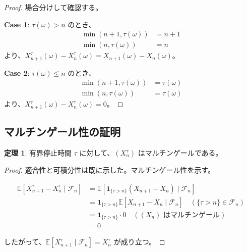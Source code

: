 \documentclass[12pt,a4paper]{article}
\theoremstyle{definition}
\newtheorem{theorem}[definition]{定理}
\newcommand{\E}{\mathbb{E}}
\newcommand{\cF}{\mathcal{F}}
\begin{document}
\begin{proof}
場合分けして確認する。

\textbf{Case 1}: $\tau(\omega) > n$ のとき、
\begin{align*}
\min(n+1, \tau(\omega)) &= n+1 \\
\min(n, \tau(\omega)) &= n
\end{align*}
より、$X^\tau_{n+1}(\omega) - X^\tau_n(\omega) = X_{n+1}(\omega) - X_n(\omega)$。

\textbf{Case 2}: $\tau(\omega) \leq n$ のとき、
\begin{align*}
\min(n+1, \tau(\omega)) &= \tau(\omega) \\
\min(n, \tau(\omega)) &= \tau(\omega)
\end{align*}
より、$X^\tau_{n+1}(\omega) - X^\tau_n(\omega) = 0$。
\end{proof}

\subsection{マルチンゲール性の証明}

\begin{theorem}
有界停止時間 $\tau$ に対して、$(X^\tau_n)$ はマルチンゲールである。
\end{theorem}

\begin{proof}
適合性と可積分性は既に示した。マルチンゲール性を示す。

\begin{align*}
\E[X^\tau_{n+1} - X^\tau_n \mid \cF_n]
&= \E[\mathbf{1}_{\{\tau > n\}} (X_{n+1} - X_n) \mid \cF_n] \\
&= \mathbf{1}_{\{\tau > n\}} \E[X_{n+1} - X_n \mid \cF_n] \quad (\{\tau > n\} \in \cF_n) \\
&= \mathbf{1}_{\{\tau > n\}} \cdot 0 \quad (\text{$(X_n)$ はマルチンゲール}) \\
&= 0
\end{align*}

したがって、$\E[X^\tau_{n+1} \mid \cF_n] = X^\tau_n$ が成り立つ。
\end{proof}
\end{document}
